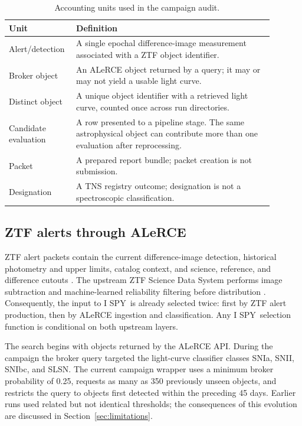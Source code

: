 \documentclass[11pt]{article}
\newcommand{\project}{I SPY}
\begin{document}
\begin{table}[ht]
\centering
\caption{Accounting units used in the campaign audit.}
\label{tab:units}
\begin{tabular}{p{0.19\linewidth}p{0.70\linewidth}}
\toprule
Unit & Definition \\
\midrule
Alert/detection & A single epochal difference-image measurement associated with a ZTF object identifier. \\
Broker object & An ALeRCE object returned by a query; it may or may not yield a usable light curve. \\
Distinct object & A unique object identifier with a retrieved light curve, counted once across run directories. \\
Candidate evaluation & A row presented to a pipeline stage. The same astrophysical object can contribute more than one evaluation after reprocessing. \\
Packet & A prepared report bundle; packet creation is not submission. \\
Designation & A TNS registry outcome; designation is not a spectroscopic classification. \\
\bottomrule
\end{tabular}
\end{table}

\subsection{ZTF alerts through ALeRCE}

ZTF alert packets contain the current difference-image detection, historical photometry and upper limits, catalog context, and science, reference, and difference cutouts \citep{patterson2019}. The upstream ZTF Science Data System performs image subtraction and machine-learned reliability filtering before distribution \citep{masci2019,duev2019}. Consequently, the input to \project\ is already selected twice: first by ZTF alert production, then by ALeRCE ingestion and classification. Any \project\ selection function is conditional on both upstream layers.

The search begins with objects returned by the ALeRCE API. During the campaign the broker query targeted the light-curve classifier classes SNIa, SNII, SNIbc, and SLSN. The current campaign wrapper uses a minimum broker probability of 0.25, requests as many as 350 previously unseen objects, and restricts the query to objects first detected within the preceding 45 days. Earlier runs used related but not identical thresholds; the consequences of this evolution are discussed in Section~\ref{sec:limitations}.
\end{document}
